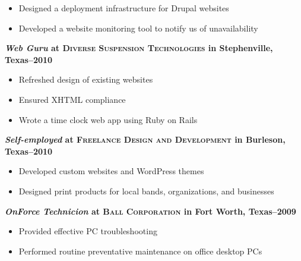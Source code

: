 \documentclass[margin]{res}
\begin{document}
\begin{resume}
\begin{itemize}
                   \item Designed a deployment infrastructure for Drupal websites
                 
                   \item Developed a website monitoring tool to notify us of unavailability
                 \end{itemize}
              
                \textbf{\textit{Web Guru}
                 at \textsc{Diverse Suspension Technologies} in Stephenville, Texas--2010}
                 \vspace{-10pt}\begin{itemize} \itemsep -2pt %
                   \item Refreshed design of existing websites
                 
                   \item Ensured XHTML compliance
                 
                   \item Wrote a time clock web app using Ruby on Rails
                 \end{itemize}
              
                \textbf{\textit{Self-employed}
                 at \textsc{Freelance Design and Development} in Burleson, Texas--2010}
                 \vspace{-10pt}\begin{itemize} \itemsep -2pt %
                   \item Developed custom websites and WordPress themes
                 
                   \item Designed print products for local bands, organizations, and businesses
                 \end{itemize}
              
                \textbf{\textit{OnForce Technicion}
                 at \textsc{Ball Corporation} in Fort Worth, Texas--2009}
                 \vspace{-10pt}\begin{itemize} \itemsep -2pt %
                   \item Provided effective PC troubleshooting
                 
                   \item Performed routine preventative maintenance on office desktop PCs
                 \end{itemize}
              


\end{resume}
\end{document}
